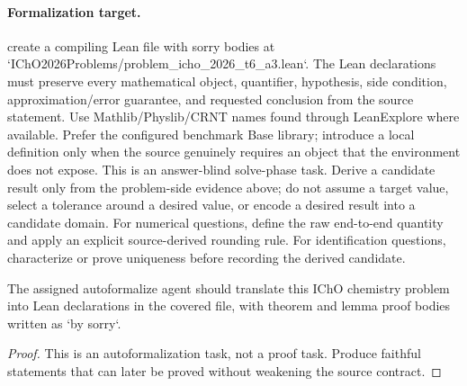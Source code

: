 \paragraph{Formalization target.}
create a compiling Lean file with sorry bodies at `IChO2026Problems/problem\_icho\_2026\_t6\_a3.lean`.
The Lean declarations must preserve every mathematical object, quantifier, hypothesis, side condition, approximation/error guarantee, and requested conclusion from the source statement.
Use Mathlib/Physlib/CRNT names found through LeanExplore where available. Prefer the configured benchmark Base library; introduce a local definition only when the source genuinely requires an object that the environment does not expose.
This is an answer-blind solve-phase task. Derive a candidate result only from the problem-side evidence above; do not assume a target value, select a tolerance around a desired value, or encode a desired result into a candidate domain.
For numerical questions, define the raw end-to-end quantity and apply an explicit source-derived rounding rule. For identification questions, characterize or prove uniqueness before recording the derived candidate.

\begin{theorem}
\label{thm:physics:icho_2026_t6_a3:target}
The assigned autoformalize agent should translate this IChO chemistry problem into Lean declarations in the covered file, with theorem and lemma proof bodies written as `by sorry`.
\end{theorem}
\begin{proof}
This is an autoformalization task, not a proof task. Produce faithful statements that can later be proved without weakening the source contract.
\end{proof}
